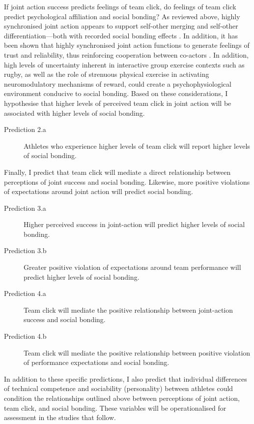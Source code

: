 \begin{mccorrection}
  \bigskip

   If joint action success predicts feelings of team click, do feelings of team click predict psychological affiliation and social bonding? As reviewed above, highly synchronised joint action appears to support self-other merging and self-other differentiation---both with recorded social bonding effects \citep{Mogan2017,Milward2016}. In addition, it has been shown that highly synchronised joint action functions to generate feelings of trust and reliability, thus reinforcing cooperation between co-actors \citep{Reddish2013a}. In addition, high levels of uncertainty inherent in interactive group exercise contexts such as rugby, as well as the role of strenuous physical exercise in activating neuromodulatory mechanisms of reward, could create a psychophysiological environment conducive to social bonding.  Based on these considerations, I hypothesise that higher levels of perceived team click in joint action will be associated with higher levels of social bonding.
  \bigskip
  \begin{indent}
  \begin{description}
    \item [Prediction 2.a] Athletes who experience higher levels of team click will report higher levels of social bonding.
  \end{description}
  \end{indent}

  Finally, I predict that team click will mediate a direct relationship between perceptions of joint success and social bonding.  Likewise, more positive violations of expectations around joint action will predict social bonding.
  \bigskip
  \begin{indent}
  \begin{description}

    \item [Prediction 3.a] Higher perceived success in joint-action will predict higher levels of social bonding.
   \item [Prediction 3.b] Greater positive violation of expectations around team performance will predict higher levels of social bonding.
    \item [Prediction 4.a] Team click will mediate the positive relationship between joint-action success and social bonding.
    \item [Prediction 4.b] Team click will mediate the positive relationship between positive violation of performance expectations and social bonding.

  \end{description}
  \end{indent}

  In addition to these specific predictions, I also predict that individual differences of technical competence and sociability (personality) between athletes could condition the relationships outlined above between perceptions of joint action, team click, and social bonding.  These variables will be operationalised for assessment in the studies that follow.
\end{mccorrection}


